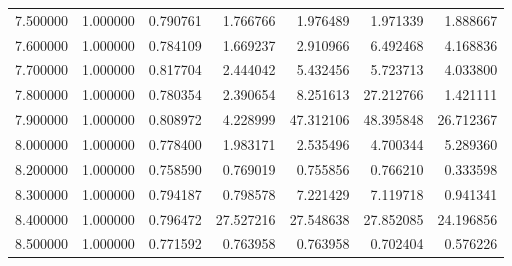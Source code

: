 \begin{table}
\begin{tabular}{rrrrrrr}
7.500000 & 1.000000 & 0.790761 & 1.766766 & 1.976489 & 1.971339 & 1.888667 \\
7.600000 & 1.000000 & 0.784109 & 1.669237 & 2.910966 & 6.492468 & 4.168836 \\
7.700000 & 1.000000 & 0.817704 & 2.444042 & 5.432456 & 5.723713 & 4.033800 \\
7.800000 & 1.000000 & 0.780354 & 2.390654 & 8.251613 & 27.212766 & 1.421111 \\
7.900000 & 1.000000 & 0.808972 & 4.228999 & 47.312106 & 48.395848 & 26.712367 \\
8.000000 & 1.000000 & 0.778400 & 1.983171 & 2.535496 & 4.700344 & 5.289360 \\
8.200000 & 1.000000 & 0.758590 & 0.769019 & 0.755856 & 0.766210 & 0.333598 \\
8.300000 & 1.000000 & 0.794187 & 0.798578 & 7.221429 & 7.119718 & 0.941341 \\
8.400000 & 1.000000 & 0.796472 & 27.527216 & 27.548638 & 27.852085 & 24.196856 \\
8.500000 & 1.000000 & 0.771592 & 0.763958 & 0.763958 & 0.702404 & 0.576226 \\
\bottomrule
\end{tabular}
\end{table}
